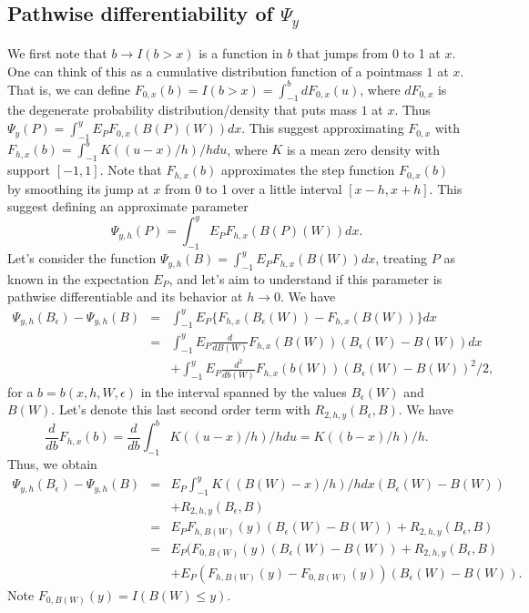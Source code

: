 \documentclass[11pt]{article}
\begin{document}
\subsection{Pathwise differentiability of $\Psi_y$}
We first note that $b\rightarrow I(b>x)$ is a function in $b$ that jumps from 0 to 1 at $x$. One can think of this as a cumulative distribution function of a pointmass $1$ at $x$.
That is, we can define $F_{0,x}(b)=I(b>x)=\int_{-1}^b dF_{0,x}(u)$, where $dF_{0,x}$ is the degenerate probability distribution/density that puts mass $1$ at $x$.
Thus $\Psi_y(P)=\int_{-1}^y E_P F_{0,x}(B(P)(W)) dx$.
This suggest approximating $F_{0,x}$ with $F_{h,x}(b)=\int_{-1}^b K((u-x)/h)/h du$, where $K$ is a mean zero density with support $[-1,1]$.
Note that $F_{h,x}(b)$ approximates the step function $F_{0,x}(b)$ by smoothing its jump at $x$ from 0 to 1 over a little interval $[x-h,x+h]$. 
This suggest defining an approximate parameter \[
\Psi_{y,h}(P)=\int_{-1}^y E_P F_{h,x}(B(P)(W)) dx.
\]
Let's consider the function $\Psi_{y,h}(B)=\int_{-1}^y E_PF_{h,x}(B(W)) dx$, treating $P$ as known in the expectation $E_P$, and let's aim to understand if this parameter is pathwise differentiable and its behavior at $h\rightarrow 0$.
We have 
\begin{eqnarray*}
\Psi_{y,h}(B_{\epsilon})-\Psi_{y,h}(B)&=&\int_{-1}^y E_P \{F_{h,x}(B_{\epsilon}(W))-F_{h,x}(B(W))\} dx\\
&=&\int_{-1}^y E_P \frac{d}{dB(W)}F_{h,x}(B(W))(B_{\epsilon}(W)-B(W))dx\\
&&+ \int_{-1}^y E_P \frac{d^2}{db(W)}F_{h,x}(b(W))(B_{\epsilon}(W)-B(W))^2/2,\end{eqnarray*}
for a $b=b(x,h,W,\epsilon)$ in the interval spanned by the values $B_{\epsilon}(W)$ and $B(W)$.
Let's denote this last second order term with $R_{2,h,y}(B_{\epsilon},B)$.
We have \[
\frac{d}{db}F_{h,x}(b)=\frac{d}{db}\int_{-1}^b K((u-x)/h)/h du=K((b-x)/h)/h .\]
Thus, we obtain
\begin{eqnarray*}
\Psi_{y,h}(B_{\epsilon})-\Psi_{y,h}(B)&=&E_P \int_{-1}^y K((B(W)-x)/h)/h dx (B_{\epsilon}(W)-B(W))\\
&&+ R_{2,h,y}(B_{\epsilon},B)\\
&=&E_P F_{h,B(W)}(y) (B_{\epsilon}(W)-B(W))+R_{2,h,y}(B_{\epsilon},B)\\
&=&E_P(F_{0,B(W)}(y)(B_{\epsilon}(W)-B(W))+R_{2,h,y}(B_{\epsilon},B)\\
&&+ E_P(F_{h,B(W)}(y)-F_{0,B(W)}(y))(B_{\epsilon}(W)-B(W)).
\end{eqnarray*}
Note $F_{0,B(W)}(y)=I(B(W)\leq y)$.
\end{document}
